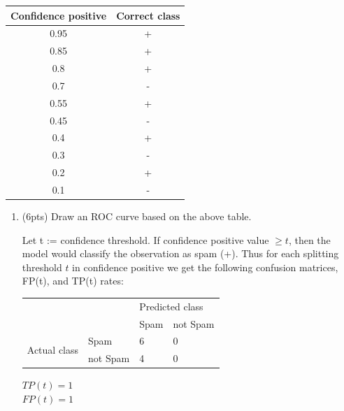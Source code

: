 \documentclass[a4paper]{article}
\theoremstyle{definition}
\newenvironment{soln}{
    \leavevmode\color{blue}\ignorespaces
}{}
\begin{document}
\begin{enumerate}
        \begin{center}
          \begin{tabular}{ c  c }
            \hline
            Confidence positive & Correct class \\ \hline
            0.95                & +             \\
            0.85                & +             \\
            0.8                 & +             \\
            0.7                 & -             \\
            0.55                & +             \\
            0.45                & -             \\
            0.4                 & +             \\
            0.3                 & -             \\
            0.2                 & +             \\
            0.1                 & -             \\
            \hline
          \end{tabular}
        \end{center}

        \begin{enumerate}
          \item (6pts) Draw an ROC curve based on the above table.

                \begin{soln}
                  Let t := confidence threshold. If confidence positive value $\ge t$, then the model would classify the observation as spam (+). Thus for each splitting threshold $t$ in confidence positive we get the following confusion matrices, FP(t), and TP(t) rates:

                  \begin{center}
                     \label{tab:title}
                    \begin{tabular}{l l | l l}
                                                    &          & \multicolumn{2}{l}{Predicted class}            \\
                                                    &          & Spam                                & not Spam \\
                      \hline
                      \multirow{2}{*}{Actual class} & Spam     & 6                                   & 0        \\
                                                    & not Spam & 4                                   & 0
                    \end{tabular}
                  \end{center}
                  $TP(t) =  1$\\
                  $FP(t) = 1$


\end{soln}
\end{enumerate}
\end{enumerate}
\end{document}
